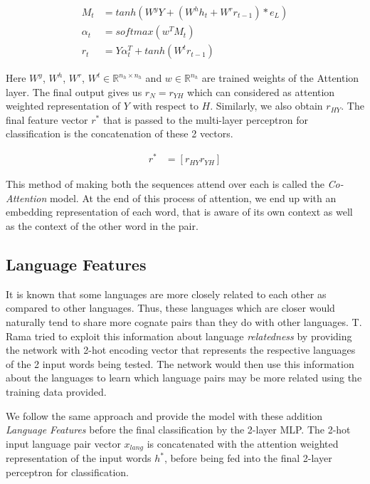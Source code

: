 \begin{align}
M_t &= tanh(W^yY + (W^hh_t + W^rr_{t-1})*e_L) \\
\alpha_t &= softmax(w^TM_t) \\
r_t &= Y\alpha_t^T + tanh(W^tr_{t-1})
\end{align}

Here $W^y$, $W^h$, $W^r$, $W^t \in  \mathbb{R}^{n_h \times n_h}$ and $w \in \mathbb{R}^{n_h}$ are trained weights of the Attention layer. The final output gives us $r_N = r_{YH}$ which can considered as attention weighted representation of $Y$ with respect to $H$. Similarly, we also obtain $r_{HY}$. The final feature vector $r^*$ that is passed to the multi-layer perceptron for classification is the concatenation of these 2 vectors.

\begin{align}
r^* &= [r_{HY} r_{YH}]
\end{align}

 This method of making both the sequences attend over each is called the \textit{Co-Attention} model. At the end of this process of attention, we end up with an embedding representation of each word, that is aware of its own context as well as the context of the other word in the pair.
 
\subsection{Language Features}

It is known that some languages are more closely related to each other as compared to other languages. Thus, these languages which are closer would naturally tend to share more cognate pairs than they do with other languages. T. Rama\citep{rama2016siamese} tried to exploit this information about language \textit{relatedness} by providing the network with 2-hot encoding vector that represents the respective languages of the 2 input words being tested. The network would then use this information about the languages to learn which language pairs may be more related using the training data provided.

We follow the same approach and provide the model with these addition \textit{Language Features} before the final classification by the 2-layer MLP. The 2-hot input language pair vector $x_{lang}$ is concatenated with the attention weighted representation of the input words $h^{*}$, before being fed into the final 2-layer perceptron for classification.

